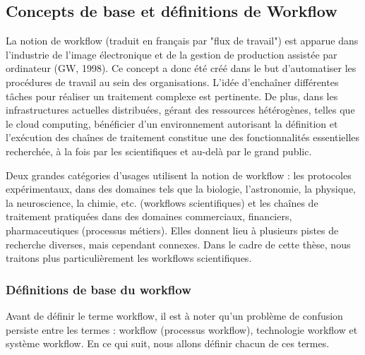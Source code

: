  	 
 	 
 	 
 	 
 	 
 	 
 	 
 	 \subsection{ Concepts de base et définitions de Workflow }
 	 
 	
 
La notion de workflow (traduit en français par "flux de travail") est apparue dans l’industrie de l’image électronique et de la gestion de production assistée par ordinateur (GW, 1998). Ce concept a donc été créé dans le but d’automatiser les procédures de travail au sein des organisations. L’idée d’enchaîner différentes tâches pour réaliser un traitement complexe est pertinente. De plus, dans les infrastructures actuelles distribuées, gérant des ressources hétérogènes, telles que le cloud computing, bénéficier d’un environnement autorisant la définition et l’exécution des chaînes de traitement constitue une des fonctionnalités essentielles recherchée, à la fois par les scientifiques et au-delà par le grand public.

Deux grandes catégories d’usages utilisent la notion de workflow : les protocoles expérimentaux, dans des domaines tels que la biologie, l’astronomie, la physique, la neuroscience, la chimie, etc. (workflows scientifiques) et les chaînes de traitement pratiquées dans des domaines commerciaux, financiers, pharmaceutiques (processus métiers). Elles donnent lieu à plusieurs pistes de recherche diverses, mais cependant connexes. Dans le cadre de cette thèse, nous traitons plus particulièrement les workflows scientifiques.

\subsubsection{Définitions  de base du  workflow}


Avant de définir le terme workflow, il est à noter qu'un problème de confusion persiste entre les termes : workflow (processus workflow), technologie workflow et système workflow. En ce qui suit, nous allons définir chacun de ces termes.

